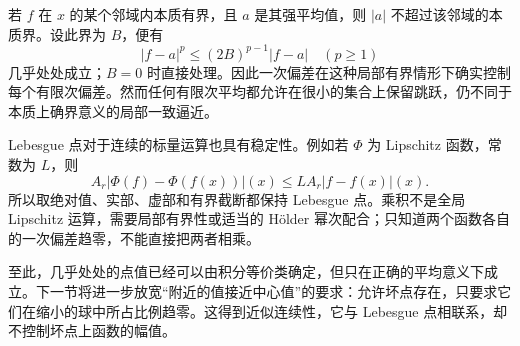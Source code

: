 \ProseParagraphBreak

若 \(f\) 在 \(x\) 的某个邻域内本质有界，且 \(a\) 是其强平均值，则 \(|a|\) 不超过该邻域的本质界。设此界为 \(B\)，便有
\[
 |f-a|^p\leq(2B)^{p-1}|f-a|\quad(p\geq1)
\]
几乎处处成立；\(B=0\) 时直接处理。因此一次偏差在这种局部有界情形下确实控制每个有限次偏差。然而任何有限次平均都允许在很小的集合上保留跳跃，仍不同于本质上确界意义的局部一致逼近。

\ProseParagraphBreak

Lebesgue 点对于连续的标量运算也具有稳定性。例如若 \(\Phi\) 为 Lipschitz 函数，常数为 \(L\)，则
\[
 A_r|\Phi(f)-\Phi(f(x))|(x)
 \leq L A_r|f-f(x)|(x).
\]
所以取绝对值、实部、虚部和有界截断都保持 Lebesgue 点。乘积不是全局 Lipschitz 运算，需要局部有界性或适当的 Hölder 幂次配合；只知道两个函数各自的一次偏差趋零，不能直接把两者相乘。

\ProseParagraphBreak

至此，几乎处处的点值已经可以由积分等价类确定，但只在正确的平均意义下成立。下一节将进一步放宽“附近的值接近中心值”的要求：允许坏点存在，只要求它们在缩小的球中所占比例趋零。这得到近似连续性，它与 Lebesgue 点相联系，却不控制坏点上函数的幅值。
